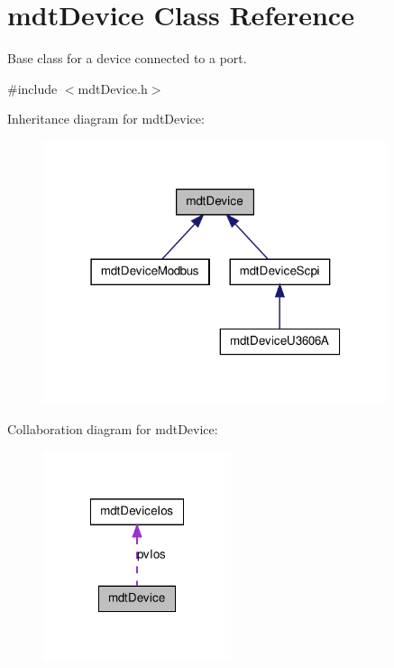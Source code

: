 \hypertarget{classmdt_device}{
\section{mdtDevice Class Reference}
\label{classmdt_device}
}


Base class for a device connected to a port.  




{\ttfamily \#include $<$mdtDevice.h$>$}



Inheritance diagram for mdtDevice:
\nopagebreak
\begin{figure}[H]
\begin{center}
\leavevmode
\includegraphics[width=286pt]{classmdt_device__inherit__graph}
\end{center}
\end{figure}


Collaboration diagram for mdtDevice:\nopagebreak
\begin{figure}[H]
\begin{center}
\leavevmode
\includegraphics[width=156pt]{classmdt_device__coll__graph}
\end{center}
\end{figure}
